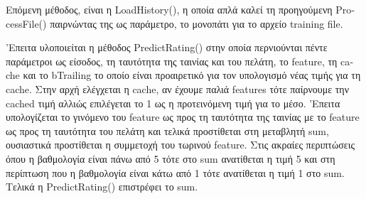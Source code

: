 \documentclass{report}
\begin{document}
Επόμενη μέθοδος, είναι η  \textlatin{LoadHistory}(), η οποία απλά καλεί τη προηγούμενη \textlatin{ProcessFile}() παιρνώντας της ως παράμετρο, το μονοπάτι για το αρχείο \textlatin{training file}. 

'Επειτα υλοποιείται η μέθοδος \textlatin{PredictRating}()  στην οποία περνιούνται πέντε παράμετροι ως είσοδος, τη ταυτότητα της ταινίας και του πελάτη, το \textlatin{feature}, τη \textlatin{cache} και το \textlatin{bTrailing} το οποίο είναι προαιρετικό για τον υπολογισμό νέας τιμής για τη \textlatin{cache}. Στην αρχή ελέγχεται η \textlatin{cache}, αν έχουμε παλιά \textlatin{features} τότε παίρνουμε την \textlatin{cached} τιμή αλλιώς επιλέγεται το 1 ως η προτεινόμενη τιμή για το μέσο.
'Επειτα υπολογίζεται το γινόμενο του \textlatin{feature} ως προς τη ταυτότητα της ταινίας με το \textlatin{feature} ως προς τη ταυτότητα του πελάτη και τελικά προστίθεται στη μεταβλητή \textlatin{sum}, ουσιαστικά προστίθεται η συμμετοχή του τωρινού \textlatin{feature}. Στις ακραίες περιπτώσεις όπου η βαθμολογία είναι πάνω από 5 τότε στο \textlatin{sum} ανατίθεται η τιμή 5 και στη περίπτωση που η βαθμολογία είναι κάτω από 1 τότε ανατίθεται η τιμή 1 στο \textlatin{sum}. Τελικά η \textlatin{PredictRating}() επιστρέφει το \textlatin{sum}. 
\end{document}
